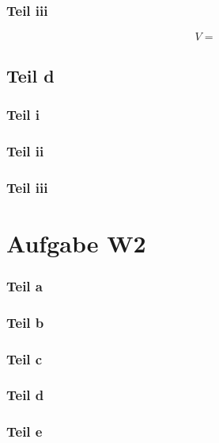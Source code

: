 \documentclass[10pt,a4paper]{article}
\begin{document}
\subsubsection{Teil iii}

\begin{equation}
  V =
\end{equation}

\subsection{Teil d}

\subsubsection{Teil i}

\subsubsection{Teil ii}

\subsubsection{Teil iii}

\section{Aufgabe W2}

\subsubsection{Teil a}

\subsubsection{Teil b}

\subsubsection{Teil c}

\subsubsection{Teil d}

\subsubsection{Teil e}
\end{document}
